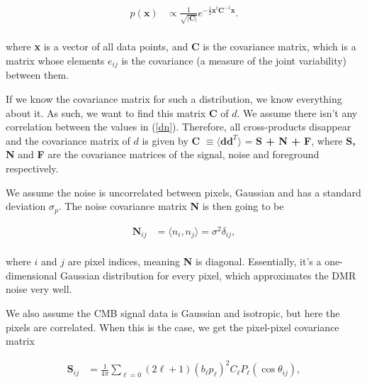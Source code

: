\documentclass{emulateapj}
\begin{document}
 \begin{equation}
 \label{gauss}
 \begin{array}{rl}
 p(\textbf{x})  &\propto \frac{1}{\sqrt{|\textbf{C}|}}e^{-\frac{1}{2}\textbf{x}^{t}\textbf{C}^{-1}\textbf{x}}. \\
 \end{array}
 \end{equation}
 
 \noindent 
  where \textbf{x} is a vector of all data points, and \textbf{C} is the covariance matrix, which is a matrix whose elements $e_{ij}$ is the covariance (a measure of the joint variability) between them.
  
    
  If we know the covariance matrix for such a distribution, we know everything about it. As such, we want to find this matrix \textbf{C} of $d$. We assume there isn't any correlation between the values in (\ref{dn}). Therefore, all cross-products disappear and the covariance matrix of $d$ is given by \textbf{C} $\equiv \langle \textbf{dd}^T \rangle$ = \textbf{S + N + F}, where \textbf{S, N} and \textbf{F} are the covariance matrices of the signal, noise and foreground respectively.
 
 We assume the noise is uncorrelated between pixels, Gaussian and has a standard deviation $\sigma_p$. The noise covariance matrix \textbf{N} is then going to be
 
  \begin{equation}
  \label{N_cov}
  \begin{array}{rl}
 \textbf{N}_{ij}  &= \langle n_i,n_j \rangle = \sigma^2\delta_{ij}, \\
  \end{array}
  \end{equation}

\noindent 
where $i$ and $j$ are pixel indices, meaning \textbf{N} is diagonal. Essentially, it's a one-dimensional Gaussian distribution for every pixel, which approximates the DMR noise very well.

We also assume the CMB signal data is Gaussian and isotropic, but here the pixels are correlated. When this is the case, we get the pixel-pixel covariance matrix 


  \begin{equation}
  \label{s_cov}
  \begin{array}{rl}
  \textbf{S}_{ij}  &= \frac{1}{4\pi} \sum_{\ell = 0}^{}(2\ell + 1)(b_{\ell}p_{\ell})^2C_{\ell}P_{\ell}(\cos \theta_{ij}), \\
  \end{array}
  \end{equation}
  
\end{document}
